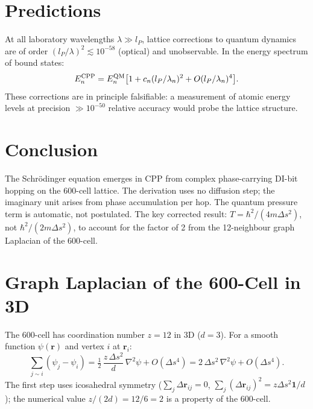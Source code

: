 \documentclass[11pt,a4paper]{article}
\newcommand{\lP}{l_P}
\begin{document}
\section{Predictions}

At all laboratory wavelengths $\lambda \gg \lP$, lattice corrections
to quantum dynamics are of order $(\lP/\lambda)^2 \lesssim 10^{-58}$
(optical) and unobservable.  In the energy spectrum of bound states:
\begin{equation}
E_n^{\rm CPP} = E_n^{\rm QM}\bigl[1 + c_n(\lP/\lambda_n)^2
+ O(\lP/\lambda_n)^4\bigr].
\end{equation}
These corrections are in principle falsifiable: a measurement of
atomic energy levels at precision $\gg 10^{-50}$ relative accuracy
would probe the lattice structure.

\section{Conclusion}

The Schr\"{o}dinger equation emerges in CPP from complex phase-carrying
DI-bit hopping on the 600-cell lattice.  The derivation uses no
diffusion step; the imaginary unit arises from phase accumulation per
hop.  The quantum pressure term is automatic, not postulated.  The
key corrected result: $T = \hbar^2/(4m\Delta s^2)$, not
$\hbar^2/(2m\Delta s^2)$, to account for the factor of 2 from the
12-neighbour graph Laplacian of the 600-cell.

\appendix
\section{Graph Laplacian of the 600-Cell in 3D}
\label{app:laplacian}

The 600-cell has coordination number $z=12$ in 3D ($d=3$).
For a smooth function $\psi(\mathbf{r})$ and vertex $i$ at $\mathbf{r}_i$:
\begin{equation}
\sum_{j\sim i}(\psi_j - \psi_i)
= \tfrac{1}{2}\,\frac{z\,\Delta s^2}{d}\,\nabla^2\psi + O(\Delta s^4)
= 2\,\Delta s^2\,\nabla^2\psi + O(\Delta s^4).
\end{equation}
The first step uses icosahedral symmetry ($\sum_j\Delta\mathbf{r}_{ij}=0$,
$\sum_j(\Delta\mathbf{r}_{ij})^2 = z\Delta s^2\mathbf{1}/d$);
the numerical value $z/(2d) = 12/6 = 2$ is a property of the 600-cell.
\end{document}
